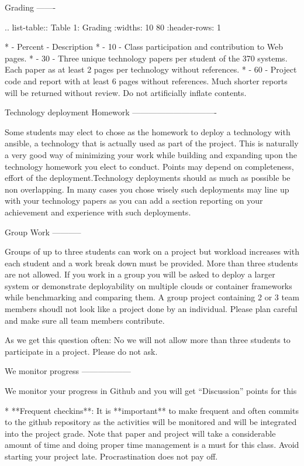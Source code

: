 Grading
-------

.. list-table:: Table 1: Grading
   :widths: 10 80
   :header-rows: 1

   * - Percent
     - Description                                               
   * - 10%
     - Class participation and contribution to Web pages.
   * - 30%
     - Three unique technology papers per student of the 370
       systems. Each paper as at least 2 pages per technology without
       references.
   * - 60%
     - Project code and report with at least 6 pages without
       references. Much shorter reports will be returned without
       review. Do not artificially inflate contents. 

Technology deployment Homework
-------------------------------

Some students may elect to chose as the homework to deploy a
technology with ansible, a technology that is actually used as part of
the project. This is naturally a very good way of minimizing your work
while building and expanding upon the technology homework you elect to
conduct. Points may depend on completeness, effort of the
deployment.Technology deployments should as much as possible be non
overlapping. In many cases you chose wisely such deployments may line
up with your technology papers as you can add a section reporting on
your achievement and experience with such deployments.

Group Work
-----------

Groups of up to three students can work on a project but workload
increases with each student and a work break down must be provided.
More than three students are not allowed. If you work in a group you
will be asked to deploy a larger system or demonstrate deployability
on multiple clouds or container frameworks while benchmarking and
comparing them. A group project containing 2 or 3 team members shoudl
not look like a project done by an individual. Please plan careful and
make sure all team members contribute.

As we get this question often: No we will not allow more than three
students to participate in a project. Please do not ask.

We monitor progress
------------------

We monitor your progress in Github and you will get ``Discussion''
points for this

* **Frequent checkins**: It is **important** to make frequent and
  often commits to the github repository as the activities will be
  monitored and will be integrated into the project grade.  Note that
  paper and project will take a considerable amount of time and doing
  proper time management is a must for this class. Avoid starting your
  project late. Procrastination does not pay off.
       
